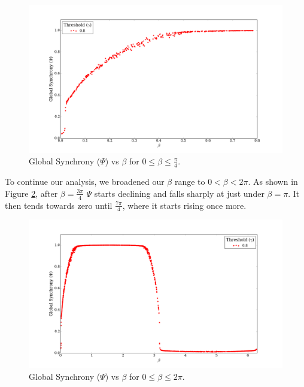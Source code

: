 \documentclass[a4paper,11pt]{article}
\begin{document}
\begin{figure}[H]
\begin{center}
\includegraphics[scale = 0.35]{figures/psi_vs_beta_orig}
\caption{
	Global Synchrony ($\Psi$) vs $\beta$ for $0 \leq \beta \leq \frac{\pi}{4}$.
	\label{fig:psi-vs-beta-orig}
}
\end{center}
\end{figure}

To continue our analysis, we broadened our $\beta$ range to $0 < \beta < 2\pi$. As shown in Figure \ref{fig:psi-vs-beta-ext}, after $\beta = \frac{3\pi}{4}$ $\Psi$ starts declining and falls sharply at just under $\beta = \pi$. It then tends towards zero until $\frac{7\pi}{4}$, where it starts rising once more.

\begin{figure}[H]
\begin{center}
\includegraphics[scale = 0.35]{figures/psi_vs_beta_ext}
\caption{
	Global Synchrony ($\Psi$) vs $\beta$ for $0 \leq \beta \leq 2\pi$.
	\label{fig:psi-vs-beta-ext}
}
\end{center}
\end{figure}
\end{document}
